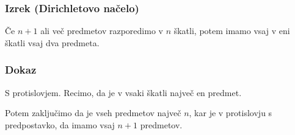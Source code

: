 \subsubsection{Izrek (Dirichletovo načelo)}
Če $n + 1$ ali več predmetov razporedimo v $n$ škatli, potem imamo vsaj v eni škatli vsaj dva predmeta.

\subsubsection{Dokaz}
S protislovjem. Recimo, da je v vsaki škatli največ en predmet.

\begin{center}
\end{center}

\noindent
Potem zaključimo da je vseh predmetov največ $n$, kar je v protislovju s predpostavko, da imamo vsaj $n+1$ predmetov.


